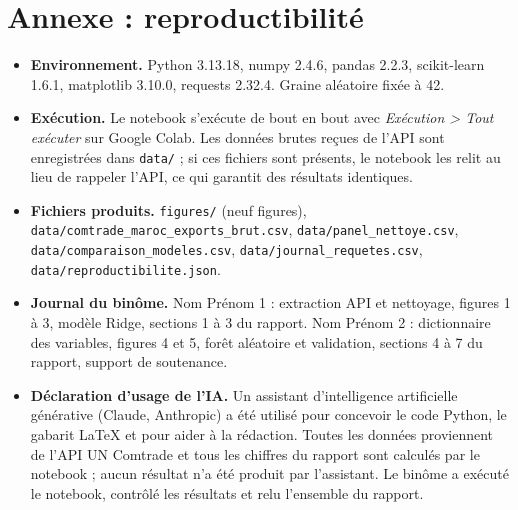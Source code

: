 \documentclass[11pt,a4paper]{article}
\begin{document}
\section{Annexe : reproductibilité}
\sloppy
\begin{itemize}
\item \textbf{Environnement.} Python 3.13.18, numpy 2.4.6, pandas 2.2.3, scikit-learn 1.6.1, matplotlib 3.10.0, requests 2.32.4. Graine aléatoire fixée à 42.
\item \textbf{Exécution.} Le notebook s'exécute de bout en bout avec \emph{Exécution > Tout exécuter} sur Google Colab. Les données brutes reçues de l'API sont enregistrées dans \texttt{data/} ; si ces fichiers sont présents, le notebook les relit au lieu de rappeler l'API, ce qui garantit des résultats identiques.
\item \textbf{Fichiers produits.} \texttt{figures/} (neuf figures), \texttt{data/comtrade\_maroc\_exports\_brut.csv}, \texttt{data/panel\_nettoye.csv}, \texttt{data/comparaison\_modeles.csv}, \texttt{data/journal\_requetes.csv}, \texttt{data/reproductibilite.json}.
\item \textbf{Journal du binôme.} Nom Prénom 1 : extraction API et nettoyage, figures 1 à 3, modèle Ridge, sections 1 à 3 du rapport. Nom Prénom 2 : dictionnaire des variables, figures 4 et 5, forêt aléatoire et validation, sections 4 à 7 du rapport, support de soutenance.
\item \textbf{Déclaration d'usage de l'IA.} Un assistant d'intelligence artificielle générative (Claude, Anthropic) a été utilisé pour concevoir le code Python, le gabarit LaTeX et pour aider à la rédaction. Toutes les données proviennent de l'API UN Comtrade et tous les chiffres du rapport sont calculés par le notebook ; aucun résultat n'a été produit par l'assistant. Le binôme a exécuté le notebook, contrôlé les résultats et relu l'ensemble du rapport.
\end{itemize}
\end{document}
